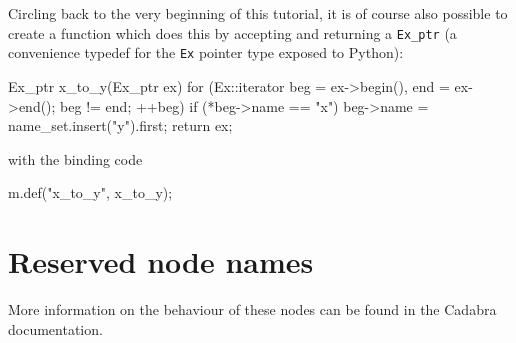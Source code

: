 \documentclass{article}
\begin{document}
Circling back to the very beginning of this tutorial, it is of course also possible to create a function which does this
by accepting and returning a \verb|Ex_ptr| (a convenience typedef for the \verb|Ex| pointer type exposed to Python):
\begin{lstcpp}
	Ex_ptr x_to_y(Ex_ptr ex)
		{
		for (Ex::iterator beg = ex->begin(), end = ex->end(); beg != end; ++beg) {
			if (*beg->name == "x")
				beg->name = name_set.insert("y").first;
			}
		return ex;
		}
\end{lstcpp}
with the binding code
\begin{lstcpp}
	m.def("x_to_y", x_to_y);
\end{lstcpp}


\appendix

\newpage
\section{Reserved node names}
\label{app:nodenames}

More information on the behaviour of these nodes can be found in the Cadabra documentation.
\end{document}
